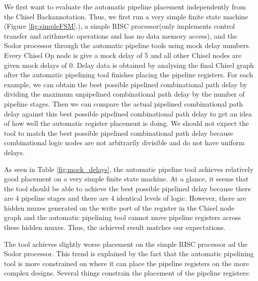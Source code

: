 
We first want to evaluate the automatic pipeline placement independently from the Chisel Backannotation. Thus, we first run a very simple finite state machine (Figure \ref{fig:simpleFSM}.), a simple RISC processor(only implements control transfer and arithmetic operations and has no data memory access), and the Sodor processor through the automatic pipeline tools using mock delay numbers. Every Chisel Op node is give a mock delay of 5 and all other Chisel nodes are given mock delays of 0. Delay data is obtained by analysing the final Chisel graph after the automatic pipelining tool finishes placing the pipeline registers. For each example, we can obtain the best possible pipelined combinational path delay by dividing the maximum unpipelined combinational path delay by the number of pipeline stages. Then we can compare the actual pipelined combinational path delay against this best possible pipelined combinational path delay to get an idea of how well the automatic register placement is doing. We should not expect the tool to match the best possible pipelined combinational path delay because combinational logic nodes are not arbitrarily divisible and do not have uniform delays.

As seen in Table \ref{fig:mock_delays}, the automatic pipeline tool achieves relatively good  placement on a very simple finite state machine. At a glance, it seems that the tool should be able to achieve the best possible pipelined delay because there are 4 pipeline stages and there are 4 identical levels of logic. However, there are hidden muxes generated on the write port of the register in the Chisel node graph and the automatic pipelining tool cannot move pipeline registers across these hidden muxes. Thus, the achieved result matches our expectations.

The tool achieves slightly worse placement on the simple RISC processor ad the Sodor processor. This trend is explained by the fact that the automatic pipelining tool is more constrained on where it can place the pipeline registers on the more complex designs. Several things constrain the placement of the pipeline registers:

